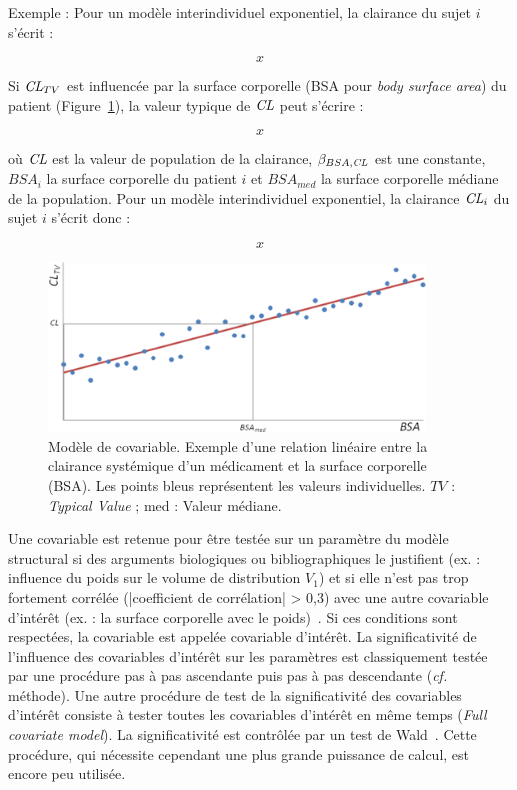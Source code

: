 Exemple : Pour un modèle interindividuel exponentiel, la clairance du sujet $i$ s'écrit :

\begin{equation}
x
\label{eq:46}
\end{equation}

Si $\operatorname{\textit{CL}}_{TV}$ est influencée par la surface corporelle (BSA pour \textit{body surface area}) du patient (Figure~\ref{fig:9}), la valeur typique de $\operatorname{\textit{CL}}$ peut s'écrire :

\begin{equation}
x
\label{eq:47}
\end{equation}

où $\operatorname{\textit{CL}}$ est la valeur de population de la clairance, $\beta_{BSA,\operatorname{\textit{CL}}}$ est une constante, $BSA_i$ la surface corporelle du patient $i$ et $BSA_{med}$ la surface corporelle médiane de la population. Pour un modèle interindividuel exponentiel, la clairance $\operatorname{\textit{CL}}_i$ du sujet $i$ s'écrit donc :

\begin{equation}
x
\label{eq:48}
\end{equation}

\begin{figure}[htbp]
	\centering
		\includegraphics[width=10cm]{figures/raster/FIG_9}
	\caption[Modèle de covariable.]{Modèle de covariable. Exemple d'une relation linéaire entre la clairance systémique d'un médicament et la surface corporelle (BSA). Les points bleus représentent les valeurs individuelles. $TV$ : \textit{Typical Value} ; med : Valeur médiane.}
	\label{fig:9}
\end{figure}

Une covariable est retenue pour être testée sur un paramètre du modèle structural si des arguments biologiques ou bibliographiques le justifient (ex. : influence du poids sur le volume de distribution $V_1$) et si elle n'est pas trop fortement corrélée (|coefficient de corrélation| > 0,3) avec une autre covariable d'intérêt (ex. : la surface corporelle avec le poids)~\citep{REF11}. Si ces conditions sont respectées, la covariable est appelée covariable d'intérêt. La significativité de l'influence des covariables d'intérêt sur les paramètres est classiquement testée par une procédure pas à pas ascendante puis pas à pas descendante (\textit{cf.} méthode). Une autre procédure de test de la significativité des covariables d'intérêt consiste à tester toutes les covariables d'intérêt en même temps (\textit{Full covariate model}). La significativité est contrôlée par un test de Wald~\citep{REF12}. Cette procédure, qui nécessite cependant une plus grande puissance de calcul, est encore peu utilisée.

